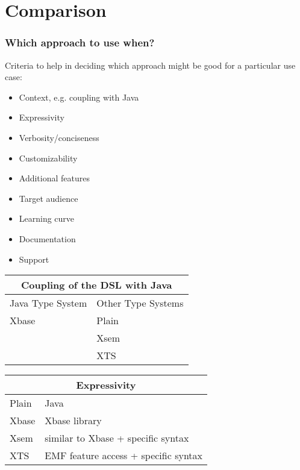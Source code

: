 \section{Comparison}

\begin{frame}
  \frametitle{Which approach to use when?}
  
  Criteria to help in deciding which approach might be good for a particular use
  case:
  \begin{itemize}
    \item Context, e.g. coupling with Java
    \item Expressivity
    \item Verbosity/conciseness
    \item Customizability
    \item Additional features
    \item Target audience
    \item Learning curve
    \item Documentation
    \item Support
  \end{itemize}

\framebreak  
\begin{tabularx}{\linewidth}{ X   X }
\multicolumn{2}{c}{Coupling of the DSL with Java} \\ \hline
Java Type System & Other Type Systems \\ \hline
Xbase & Plain  \\
& Xsem  \\
& XTS  \\
\end{tabularx}


\framebreak
\begin{tabularx}{\linewidth}{ l   X }
\multicolumn{2}{c}{Expressivity} \\ \hline
Plain & Java \\
Xbase & Xbase library \\
Xsem & similar to Xbase + specific syntax\\
XTS & EMF feature access + specific syntax\\
\end{tabularx}


\end{frame}
